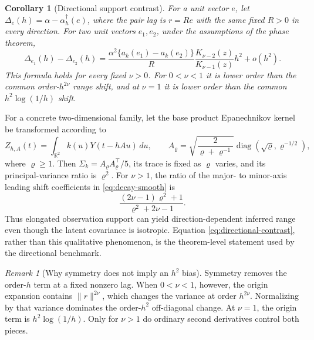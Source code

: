 \documentclass[11pt]{article}
\newtheorem{corollary}{Corollary}
\theoremstyle{remark}
\newtheorem{remark}{Remark}
\newcommand{\R}{\mathbb R}
\begin{document}
\begin{corollary}[Directional support contrast]
For a unit vector \(e\), let
\(\Delta_e(h)=\alpha-\alpha_h^\dagger(e)\), where the pair lag is \(r=Re\)
with the same fixed \(R>0\) in every direction.  For two unit vectors
\(e_1,e_2\), under the assumptions of the phase theorem,
\begin{equation}
  \Delta_{e_1}(h)-\Delta_{e_2}(h)
  =\frac{\alpha^2\{a_k(e_1)-a_k(e_2)\}}{R}
   \frac{K_{\nu-2}(z)}{K_{\nu-1}(z)}h^2+o(h^2).
  \label{eq:directional-contrast}
\end{equation}
This formula holds for every fixed \(\nu>0\).  For \(0<\nu<1\) it is lower
order than the common order-\(h^{2\nu}\) range shift, and at \(\nu=1\) it is
lower order than the common \(h^2\log(1/h)\) shift.
\end{corollary}

For a concrete two-dimensional family, let the base product Epanechnikov
kernel be transformed according to
\begin{equation}
  Z_{h,A}(t)=\int_{\R^2}k(u)Y(t-hAu)\,du,
  \qquad
  A_\varrho=\sqrt{\frac{2}{\varrho+\varrho^{-1}}}
  \operatorname{diag}(\sqrt\varrho,\varrho^{-1/2}),
  \label{eq:anisotropic-transform}
\end{equation}
where \(\varrho\geq1\).  Then \(\Sigma_k=A_\varrho A_\varrho^\top/5\), its
trace is fixed as \(\varrho\) varies, and its principal-variance ratio is
\(\varrho^2\).  For \(\nu>1\), the ratio of the major- to minor-axis leading
shift coefficients in \eqref{eq:decay-smooth} is
\begin{equation}
  \frac{(2\nu-1)\varrho^2+1}{\varrho^2+2\nu-1}.
  \label{eq:anisotropic-coefficient-ratio}
\end{equation}
Thus elongated observation support can yield direction-dependent inferred
range even though the latent covariance is isotropic.  Equation
\eqref{eq:directional-contrast}, rather than this qualitative phenomenon, is
the theorem-level statement used by the directional benchmark.

\begin{remark}[Why symmetry does not imply an \(h^2\) bias]
Symmetry removes the order-\(h\) term at a fixed nonzero lag.  When
\(0<\nu<1\), however, the origin expansion contains \(\lVert r\rVert^{2\nu}\),
which changes the variance at order \(h^{2\nu}\).  Normalizing by that variance
dominates the order-\(h^2\) off-diagonal change.  At \(\nu=1\), the origin term is
\(h^2\log(1/h)\).  Only for \(\nu>1\) do ordinary second derivatives control
both pieces.
\end{remark}
\end{document}
